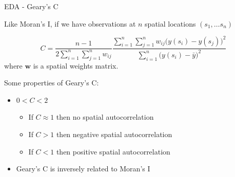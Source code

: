 \documentclass[11pt,ignorenonframetext,]{beamer}
\providecommand{\tightlist}{%
  \setlength{\itemsep}{0pt}\setlength{\parskip}{0pt}}
\begin{document}
\begin{frame}[t]{EDA - Geary's C}
\protect\hypertarget{eda---gearys-c}{}

Like Moran's I, if we have observations at \(n\) spatial locations
\((s_1, \ldots s_n)\)

\[ C = \frac{n-1}{2\sum_{i=1}^n \sum_{j=1}^n w_{ij}} \frac{\sum_{i=1}^n \sum_{j=1}^n w_{ij} \big(y(s_i)-y(s_j)\big)^2}{\sum_{i=1}^n \big(y(s_i) - \bar{y}\big)^2} \]
where \(\symbf{w}\) is a spatial weights matrix.

\pause

\vspace{7mm}

Some properties of Geary's C:

\begin{itemize}
\tightlist
\item
  \(0 < C < 2\)

  \begin{itemize}
  \tightlist
  \item
    If \(C \approx 1\) then no spatial autocorrelation
  \item
    If \(C > 1\) then negative spatial autocorrelation
  \item
    If \(C < 1\) then positive spatial autocorrelation
  \end{itemize}
\item
  Geary's C is inversely related to Moran's I
\end{itemize}

\end{frame}
\end{document}
